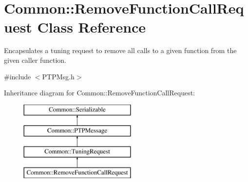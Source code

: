 \hypertarget{class_common_1_1_remove_function_call_request}{\section{Common\-:\-:Remove\-Function\-Call\-Request Class Reference}
\label{class_common_1_1_remove_function_call_request}
}


Encapsulates a tuning request to remove all calls to a given function from the given caller function.  




{\ttfamily \#include $<$P\-T\-P\-Msg.\-h$>$}

Inheritance diagram for Common\-:\-:Remove\-Function\-Call\-Request\-:\begin{figure}[H]
\begin{center}
\leavevmode
\includegraphics[height=4.000000cm]{class_common_1_1_remove_function_call_request}
\end{center}
\end{figure}
